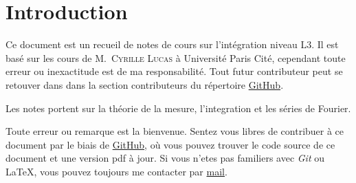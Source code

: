 \section{Introduction}

Ce document est un recueil de notes de cours sur l'intégration niveau L3. Il est
basé sur les cours de M.~\textsc{Cyrille Lucas} à Université Paris Cité, cependant toute
erreur ou inexactitude est de ma responsabilité. Tout futur contributeur
peut se retouver dans dans la section contributeurs du répertoire
\href{https://github.com/Yag000/integration-notes/graphs/contributors}{GitHub}.
\vspace{0.5cm}

Les notes portent sur la théorie de la mesure, l'integration et les séries de Fourier.
\vspace{0.5cm}

Toute erreur ou remarque est la bienvenue.
Sentez vous libres de contribuer à ce document par le biais de \href{https://github.com/Yag000/integration-notes}{GitHub},
où vous pouvez trouver le code source de ce document et une version pdf à jour.
Si vous n'etes pas familiers avec \textit{Git} ou \LaTeX , vous pouvez toujours me contacter
par \href{mailto: yago.iglesias.vazquez@gmail.com}{mail}.




